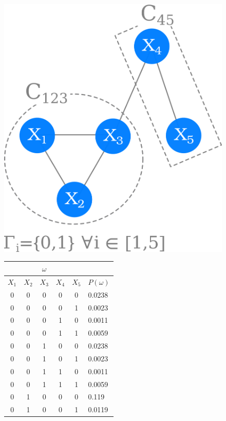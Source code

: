 \begin{figure}
\center
\begin{minipage}{0.3\textwidth}
\includegraphics[scale=0.10]{figures/chapter3/mrf/mrf-example.png}
\end{minipage}%
\begin{minipage}{0.35\textwidth}
\tiny
\begin{tabular}{|c|c|c|c|c|l|}
\hline
\multicolumn{5}{|c|}{$\omega$} & \\
\hline
$X_1$ & $X_2$ & $X_3$ & $X_4$ & $X_5$ & $P(\omega)$\\
\hline
0 & 0 & 0 & 0 & 0 & 0.0238 \\
0 & 0 & 0 & 0 & 1 & 0.0023 \\
0 & 0 & 0 & 1 & 0 & 0.0011 \\
0 & 0 & 0 & 1 & 1 & 0.0059 \\
0 & 0 & 1 & 0 & 0 & 0.0238 \\
0 & 0 & 1 & 0 & 1 & 0.0023 \\
0 & 0 & 1 & 1 & 0 & 0.0011 \\
0 & 0 & 1 & 1 & 1 & 0.0059 \\
0 & 1 & 0 & 0 & 0 & 0.119 \\
0 & 1 & 0 & 0 & 1 & 0.0119 \\

\end{tabular}
\end{minipage}
\end{figure}

